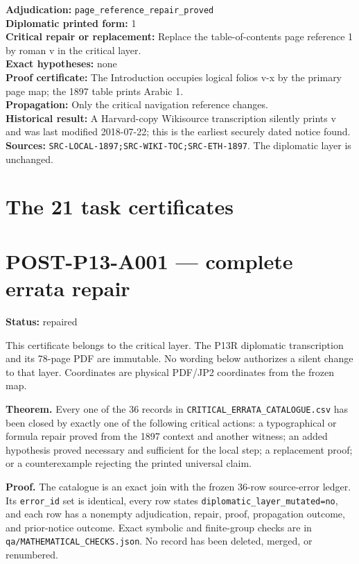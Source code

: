 \documentclass[
  10pt,
  a4paper,
]{scrreprt}
\begin{document}
\textbf{Adjudication:} \texttt{page\_reference\_repair\_proved}\\
\textbf{Diplomatic printed form:} 1\\
\textbf{Critical repair or replacement:} Replace the table-of-contents
page reference 1 by roman v in the critical layer.\\
\textbf{Exact hypotheses:} none\\
\textbf{Proof certificate:} The Introduction occupies logical folios v-x
by the primary page map; the 1897 table prints Arabic 1.\\
\textbf{Propagation:} Only the critical navigation reference changes.\\
\textbf{Historical result:} A Harvard-copy Wikisource transcription
silently prints v and was last modified 2018-07-22; this is the earliest
securely dated notice found.\\
\textbf{Sources:} \texttt{SRC-LOCAL-1897;SRC-WIKI-TOC;SRC-ETH-1897}. The
diplomatic layer is unchanged.

\section{The 21 task certificates}\label{the-21-task-certificates}

\section{POST-P13-A001 --- complete errata
repair}\label{post-p13-a001-complete-errata-repair}

\textbf{Status:} repaired

This certificate belongs to the critical layer. The P13R diplomatic
transcription and its 78-page PDF are immutable. No wording below
authorizes a silent change to that layer. Coordinates are physical
PDF/JP2 coordinates from the frozen map.

\textbf{Theorem.} Every one of the 36 records in
\texttt{CRITICAL\_ERRATA\_CATALOGUE.csv} has been closed by exactly one
of the following critical actions: a typographical or formula repair
proved from the 1897 context and another witness; an added hypothesis
proved necessary and sufficient for the local step; a replacement proof;
or a counterexample rejecting the printed universal claim.

\textbf{Proof.} The catalogue is an exact join with the frozen 36-row
source-error ledger. Its \texttt{error\_id} set is identical, every row
states \texttt{diplomatic\_layer\_mutated=no}, and each row has a
nonempty adjudication, repair, proof, propagation outcome, and
prior-notice outcome. Exact symbolic and finite-group checks are in
\texttt{qa/MATHEMATICAL\_CHECKS.json}. No record has been deleted,
merged, or renumbered.
\end{document}
